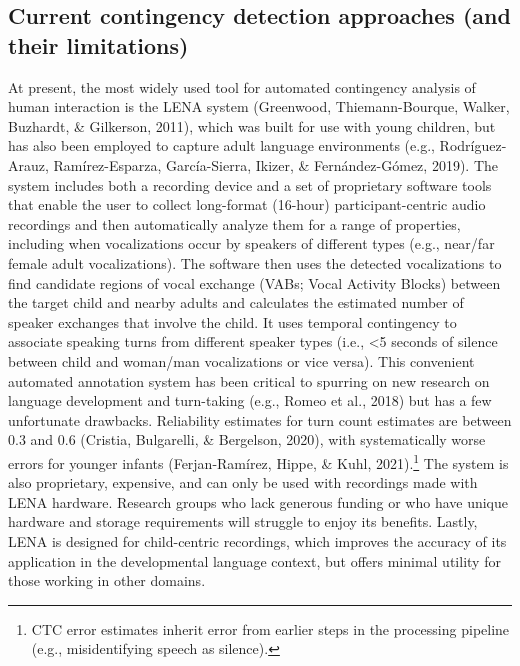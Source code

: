 \documentclass[10pt, letterpaper]{article}
\begin{document}
\hypertarget{current-contingency-detection-approaches-and-their-limitations}{%
\subsection{Current contingency detection approaches (and their
limitations)}\label{current-contingency-detection-approaches-and-their-limitations}}

At present, the most widely used tool for automated contingency analysis
of human interaction is the LENA system (Greenwood, Thiemann-Bourque,
Walker, Buzhardt, \& Gilkerson, 2011), which was built for use with
young children, but has also been employed to capture adult language
environments (e.g., Rodríguez-Arauz, Ramírez-Esparza, García-Sierra,
Ikizer, \& Fernández-Gómez, 2019). The system includes both a recording
device and a set of proprietary software tools that enable the user to
collect long-format (16-hour) participant-centric audio recordings and
then automatically analyze them for a range of properties, including
when vocalizations occur by speakers of different types (e.g., near/far
female adult vocalizations). The software then uses the detected
vocalizations to find candidate regions of vocal exchange (VABs; Vocal
Activity Blocks) between the target child and nearby adults and
calculates the estimated number of speaker exchanges that involve the
child. It uses temporal contingency to associate speaking turns from
different speaker types (i.e., \textless5 seconds of silence between
child and woman/man vocalizations or vice versa). This convenient
automated annotation system has been critical to spurring on new
research on language development and turn-taking (e.g., Romeo et al.,
2018) but has a few unfortunate drawbacks. Reliability estimates for
turn count estimates are between 0.3 and 0.6 (Cristia, Bulgarelli, \&
Bergelson, 2020), with systematically worse errors for younger infants
(Ferjan-Ramírez, Hippe, \& Kuhl, 2021).\footnote{CTC error estimates
  inherit error from earlier steps in the processing pipeline (e.g.,
  misidentifying speech as silence).} The system is also proprietary,
expensive, and can only be used with recordings made with LENA hardware.
Research groups who lack generous funding or who have unique hardware
and storage requirements will struggle to enjoy its benefits. Lastly,
LENA is designed for child-centric recordings, which improves the
accuracy of its application in the developmental language context, but
offers minimal utility for those working in other domains.
\end{document}

